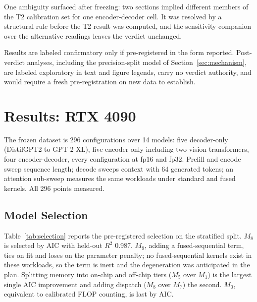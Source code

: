 \documentclass[conference]{IEEEtran}
\begin{document}
One ambiguity surfaced after freezing: two sections implied different
members of the T2 calibration set for one encoder-decoder cell. It was
resolved by a structural rule before the T2 result was computed, and the
sensitivity companion over the alternative readings leaves the verdict
unchanged.

Results are labeled confirmatory only if pre-registered in the form
reported. Post-verdict analyses, including the precision-split model of
Section~\ref{sec:mechanism}, are labeled exploratory in text and figure
legends, carry no verdict authority, and would require a fresh
pre-registration on new data to establish.

\section{Results: RTX 4090}
\label{sec:results4090}

The frozen dataset is 296 configurations over 14 models: five decoder-only
(DistilGPT2 to GPT-2-XL), five encoder-only including two vision
transformers, four encoder-decoder, every configuration at fp16 and fp32.
Prefill and encode sweep sequence length; decode sweeps context with 64
generated tokens; an attention sub-sweep measures the same workloads under
standard and fused kernels. All 296 points measured.

\subsection{Model Selection}

Table~\ref{tab:selection} reports the pre-registered selection on the
stratified split. $M_8$ is selected by AIC with held-out $R^2$ 0.987. $M_9$,
adding a fused-sequential term, ties on fit and loses on the parameter
penalty; no fused-sequential kernels exist in these workloads, so the term is
inert and the degeneration was anticipated in the plan. Splitting memory
into on-chip and off-chip tiers ($M_5$ over $M_1$) is the largest single
AIC improvement and adding dispatch ($M_8$ over $M_7$) the second. $M_0$,
equivalent to calibrated FLOP counting, is last by AIC.
\end{document}
